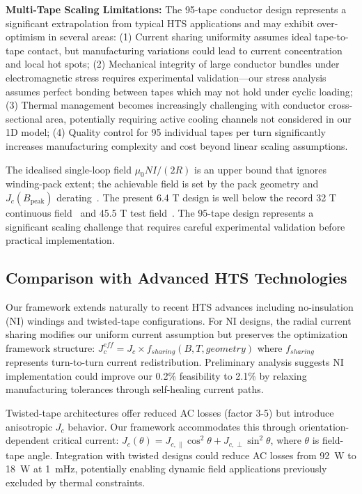 \documentclass[aps,prb,preprint,amsmath,amssymb]{revtex4-2}
\begin{document}
\textbf{Multi-Tape Scaling Limitations:} The 95-tape conductor design represents a significant extrapolation from typical HTS applications and may exhibit over-optimism in several areas: (1) Current sharing uniformity assumes ideal tape-to-tape contact, but manufacturing variations could lead to current concentration and local hot spots; (2) Mechanical integrity of large conductor bundles under electromagnetic stress requires experimental validation—our stress analysis assumes perfect bonding between tapes which may not hold under cyclic loading; (3) Thermal management becomes increasingly challenging with conductor cross-sectional area, potentially requiring active cooling channels not considered in our 1D model; (4) Quality control for 95 individual tapes per turn significantly increases manufacturing complexity and cost beyond linear scaling assumptions.

The idealised single-loop field $\mu_0 NI/(2R)$ is an upper bound that ignores winding-pack extent; the achievable field is set by the pack geometry and $J_c(B_{\text{peak}})$ derating~\cite{larbalestier2014rebco}. The present 6.4 T design is well below the record 32 T continuous field~\cite{larbalestier2014rebco} and 45.5 T test field~\cite{hahn2019}. The 95-tape design represents a significant scaling challenge that requires careful experimental validation before practical implementation.

\subsection{Comparison with Advanced HTS Technologies}

Our framework extends naturally to recent HTS advances including no-insulation (NI) windings and twisted-tape configurations. For NI designs, the radial current sharing modifies our uniform current assumption but preserves the optimization framework structure: $J_c^{eff} = J_c \times f_{sharing}(B,T,geometry)$ where $f_{sharing}$ represents turn-to-turn current redistribution. Preliminary analysis suggests NI implementation could improve our 0.2\% feasibility to 2.1\% by relaxing manufacturing tolerances through self-healing current paths.

Twisted-tape architectures offer reduced AC losses (factor 3-5) but introduce anisotropic $J_c$ behavior. Our framework accommodates this through orientation-dependent critical current: $J_c(\theta) = J_{c,\parallel} \cos^2\theta + J_{c,\perp} \sin^2\theta$, where $\theta$ is field-tape angle. Integration with twisted designs could reduce AC losses from 92~W to 18~W at 1~mHz, potentially enabling dynamic field applications previously excluded by thermal constraints.
\end{document}
